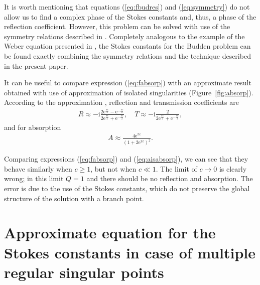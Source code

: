 \documentclass[asy]{iosart2x}
\def\rmi{\mathrm{i}}
\def\rme{\mathrm{e}}
\newcommand\eref[1]{(\ref{#1})}
\newcommand\fref[1]{Figure~\ref{#1}}
\begin{document}
It is worth mentioning that equations \eref{eq:fbudres} and \eref{eq:symmetry} do not allow us
to find a complex phase of the Stokes constants and, thus, a phase of the reflection coefficient.
However, this problem can be solved with use of the symmetry relations described in 
\cite{aksymm}. Completely analogous to the example of the Weber equation presented in
\cite{aksymm}, the Stokes constants for the Budden problem can be found exactly combining
the symmetry relations and the technique described in the present paper.

It can be useful to compare expression \eref{eq:fabsorp} with an approximate result 
obtained with use of approximation of isolated singularities (\fref{fig:absorp}). According to the 
approximation \cite{rwbook}, reflection and transmission coefficients are
\begin{eqnarray}
R \approx 
-\rmi \frac{2 \rme^{\frac{\pi c}{2}} - \rme^{-\frac{\pi c}{2}}}{2 \rme^{\frac{\pi c}{2}} + \rme^{-\frac{\pi c}{2}}},
\quad
T \approx -\rmi \frac{2}{2 \rme^{\frac{\pi c}{2}} + \rme^{-\frac{\pi c}{2}}},
\end{eqnarray}
and for absorption
\begin{eqnarray}
A \approx \frac{4 \rme^{\pi c}}{(1 + 2 \rme^{\pi c})^2}.
\label{eq:aisabsorp}
\end{eqnarray}

Comparing expressions \eref{eq:fabsorp} and \eref{eq:aisabsorp}, we can see that 
they behave similarly when $c \geq 1$, 
but not when $c \ll 1$. The limit of $c\rightarrow 0$ is clearly wrong; in this limit $Q=1$
and there should be no reflection and absorption. The error is due to the use of the Stokes constants, 
which do not preserve the global structure of the solution with a branch point. 

\section{Approximate equation for the Stokes constants in case of multiple regular singular points \label{sec:approx}}
\end{document}
